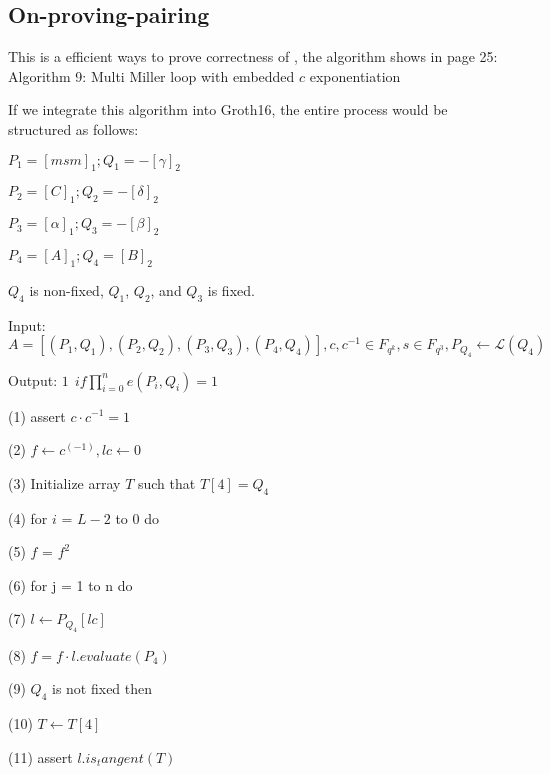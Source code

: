 \subsection{On-proving-pairing}

This is a efficient ways to prove correctness of \cite{website:On-proving-pairing}, the algorithm shows in page 25: Algorithm 9: Multi Miller loop with embedded $c$ exponentiation 

If we integrate this algorithm into Groth16, the entire process would be structured as follows:	\newline

 $\displaystyle P_1 = [msm]_1; Q_1 = -[\gamma]_2 $ \newline

 $\displaystyle P_2 = [C]_1; Q_2 = -[\delta]_2 $

 $\displaystyle P_3 = [\alpha]_1; Q_3 = -[\beta]_2 $

 $\displaystyle P_4 = [A]_1; Q_4 = [B]_2 $


$Q_4$ is non-fixed, $Q_1$, $Q_2$, and $Q_3$ is fixed. \newline


Input: $\displaystyle A = [(P_1,Q_1), (P_2,Q_2), (P_3,Q_3),(P_4,Q_4)],c, c^{-1} \in F_{q^k},s \in F_{q^3},P_{Q_4} \leftarrow \mathcal{L}(Q_4)$ \newline

Output: $\displaystyle 1 \ \ if \prod_{i=0}^{n}e(P_i, Q_i) = 1 $  \newline

(1) assert $\displaystyle c \cdot c^{-1} = 1 $ 

(2) $\displaystyle f \leftarrow c^(-1), lc \leftarrow 0 $ 

(3) Initialize array $T$ such that $\displaystyle T[4] = Q_4 $

(4) for $i$ = $L-2$ to $0$ do 

(5) \indent $f$ = $f^2$ 

(6) \indent for j = 1 to n do 

(7) \indent \indent $\displaystyle l \leftarrow P_{Q_4}[lc] $ 

(8) \indent \indent $\displaystyle f = f \cdot l.evaluate(P_4) $  

(9) \indent \indent $Q_4$ is not fixed then 

(10) \indent \indent \indent $\displaystyle T \leftarrow T[4] $ 

(11) \indent \indent \indent assert $\displaystyle l.is_tangent(T) $ 


